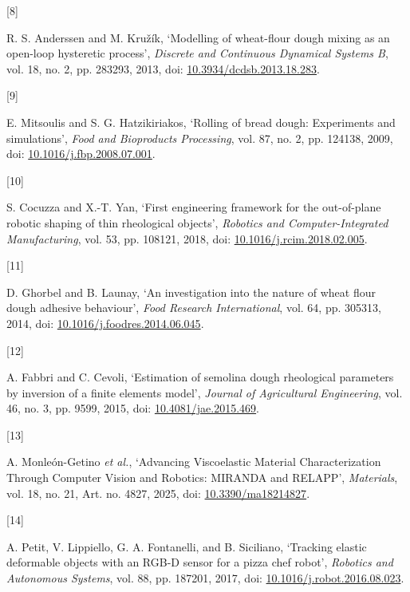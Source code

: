 \documentclass[
  11pt,
]{article}
\newlength{\cslhangindent}
\newlength{\csllabelwidth}
\newenvironment{CSLReferences}[2] %
 {\begin{list}{}{%
  \setlength{\itemindent}{0pt}
  \setlength{\leftmargin}{0pt}
  \setlength{\parsep}{0pt}
  \ifodd #1
   \setlength{\leftmargin}{\cslhangindent}
   \setlength{\itemindent}{-1\cslhangindent}
  \fi
  \setlength{\itemsep}{#2\baselineskip}}}
 {\end{list}}
\newcommand{\CSLLeftMargin}[1]{\parbox[t]{\csllabelwidth}{\strut#1\strut}}
\newcommand{\CSLRightInline}[1]{\parbox[t]{\linewidth - \csllabelwidth}{\strut#1\strut}}
\begin{document}
\begin{CSLReferences}{0}{0}
\CSLLeftMargin{{[}8{]} }%
\CSLRightInline{R. S. Anderssen and M. Kružík, {`Modelling of
wheat-flour dough mixing as an open-loop hysteretic process'},
\emph{Discrete and Continuous Dynamical Systems
\textendash{}\allowbreak{} B}, vol. 18, no. 2, pp.
283\textendash{}\allowbreak{}293, 2013, doi:
\href{https://doi.org/10.3934/dcdsb.2013.18.283}{10.3934/dcdsb.2013.18.283}.}

\CSLLeftMargin{{[}9{]} }%
\CSLRightInline{E. Mitsoulis and S. G. Hatzikiriakos, {`Rolling of bread
dough: Experiments and simulations'}, \emph{Food and Bioproducts
Processing}, vol. 87, no. 2, pp. 124\textendash{}\allowbreak{}138, 2009,
doi:
\href{https://doi.org/10.1016/j.fbp.2008.07.001}{10.1016/j.fbp.2008.07.001}.}

\CSLLeftMargin{{[}10{]} }%
\CSLRightInline{S. Cocuzza and X.-T. Yan, {`First engineering framework
for the out-of-plane robotic shaping of thin rheological objects'},
\emph{Robotics and Computer-Integrated Manufacturing}, vol. 53, pp.
108\textendash{}\allowbreak{}121, 2018, doi:
\href{https://doi.org/10.1016/j.rcim.2018.02.005}{10.1016/j.rcim.2018.02.005}.}

\CSLLeftMargin{{[}11{]} }%
\CSLRightInline{D. Ghorbel and B. Launay, {`An investigation into the
nature of wheat flour dough adhesive behaviour'}, \emph{Food Research
International}, vol. 64, pp. 305\textendash{}\allowbreak{}313, 2014,
doi:
\href{https://doi.org/10.1016/j.foodres.2014.06.045}{10.1016/j.foodres.2014.06.045}.}

\CSLLeftMargin{{[}12{]} }%
\CSLRightInline{A. Fabbri and C. Cevoli, {`Estimation of semolina dough
rheological parameters by inversion of a finite elements model'},
\emph{Journal of Agricultural Engineering}, vol. 46, no. 3, pp.
95\textendash{}\allowbreak{}99, 2015, doi:
\href{https://doi.org/10.4081/jae.2015.469}{10.4081/jae.2015.469}.}

\CSLLeftMargin{{[}13{]} }%
\CSLRightInline{A. Monleón-Getino \emph{et al.}, {`Advancing
Viscoelastic Material Characterization Through Computer Vision and
Robotics: MIRANDA and RELAPP'}, \emph{Materials}, vol. 18, no. 21, Art.
no. 4827, 2025, doi:
\href{https://doi.org/10.3390/ma18214827}{10.3390/ma18214827}.}

\CSLLeftMargin{{[}14{]} }%
\CSLRightInline{A. Petit, V. Lippiello, G. A. Fontanelli, and B.
Siciliano, {`Tracking elastic deformable objects with an RGB-D sensor
for a pizza chef robot'}, \emph{Robotics and Autonomous Systems}, vol.
88, pp. 187\textendash{}\allowbreak{}201, 2017, doi:
\href{https://doi.org/10.1016/j.robot.2016.08.023}{10.1016/j.robot.2016.08.023}.}


\end{CSLReferences}
\end{document}
